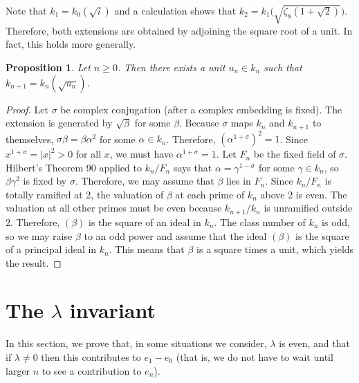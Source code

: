 \documentclass{amsart}
\newtheorem{proposition}[theorem]{Proposition}
\begin{document}
Note that $k_1=k_0(\sqrt{i})$ and a calculation shows that $k_2=k_1\big(\sqrt{\zeta_8(1+\sqrt{2})}\big)$. Therefore, both extensions
are obtained by adjoining the square root of a unit. In fact, this holds more generally.

\begin{proposition}\label{sqrtunit} Let $n\ge 0$. Then there exists a unit $u_n \in k_n$ such that $k_{n+1}=k_n(\sqrt{u_n})$.
\end{proposition}
\begin{proof}
 Let $\sigma$ be complex conjugation
(after a complex embedding is fixed).
The extension is generated by $\sqrt{\beta}$ for some $\beta$.
Because $\sigma$ maps $k_n$ and $k_{n+1}$ to themselves, $\sigma \beta = \beta \alpha^2$ for some $\alpha\in k_n$.
Therefore, $(\alpha^{1+\sigma })^2=1$.
Since $x^{1+\sigma} = |x|^2 > 0$ for all $x$, we must have
$\alpha^{1+ \sigma} = 1$. Let $F_n$ be the fixed field of $\sigma$. Hilbert's Theorem 90 applied to $k_n/F_n$
says that $\alpha = \gamma^{1-\sigma}$ for some $\gamma\in k_{n}$,
so $\beta \gamma^2$ is fixed by $\sigma$.
Therefore, we may assume that $\beta$ lies in $F_n$.
Since $k_n/F_n$ is totally ramified at 2, the valuation
of $\beta$ at each prime of $k_n$ above 2 is even. The valuation at all other primes 
must be even because $k_{n+1}/k_n$ is unramified outside 2. Therefore, $(\beta)$ is the square of an ideal
in $k_n$. The class number of $k_n$ is odd, so we may raise
$\beta$ to an odd power and assume that the ideal $(\beta)$ is the square
of a principal ideal in $k_n$. This means that $\beta$ is a square times a unit, which yields the result.\end{proof}

\section{The $\mathbb{\lambda}$ invariant}

In this section, we prove that, in some situations we consider, $\lambda$ is even, and that if $\lambda \ne 0$
then this contributes to $e_1-e_0$ (that is, we do not have to wait until larger $n$ to see a contribution
to $e_n$).
\end{document}
